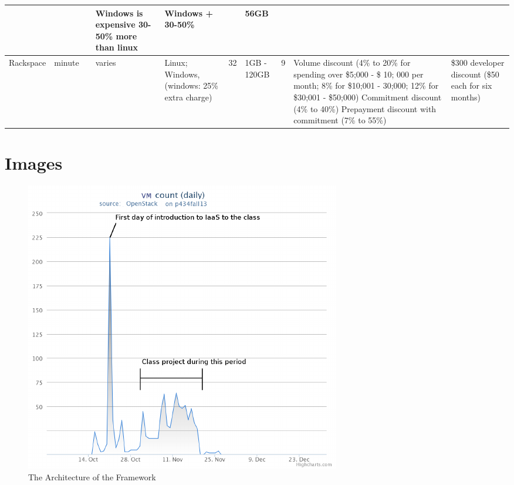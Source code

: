 \documentclass{sig-alternate}
\begin{document}
\begin{table}
\begin{small}
\begin{tabular}{|p{2cm}|p{2cm}|p{1.5cm}|p{1.5cm}|p{2cm}|p{1cm}|p{1.5cm}|p{2cm}|p{2cm}|p{2cm}|}
 &  &  & Windows is expensive 30-50\% more than linux & Windows + 30-50\%  &  & 56GB &  &  & \\
\hline 
Rackspace & minute &  & varies & Linux; Windows, (windows: 25\% extra charge) & 32 & 1GB - 120GB  & 9 & Volume discount (4\% to 20\% for spending over \$5;000 - \$ 10; 000 per month; 8\% for \$10;001 - 30;000; 12\% for \$30;001 - \$50;000) Commitment discount (4\% to 40\%) Prepayment discount with commitment (7\% to 55\%)& \$300 developer discount (\$50 each for six months)\\
\hline
\end{tabular}
\end{small}
\end{table}


\section{Images}



\begin{figure}[htb] 
  \centering 
    \includegraphics[width=1.0\columnwidth]{images/fig1.pdf} 
  \caption{The Architecture of the Framework}\label{F:fig1} 
\end{figure} 
\end{document}
